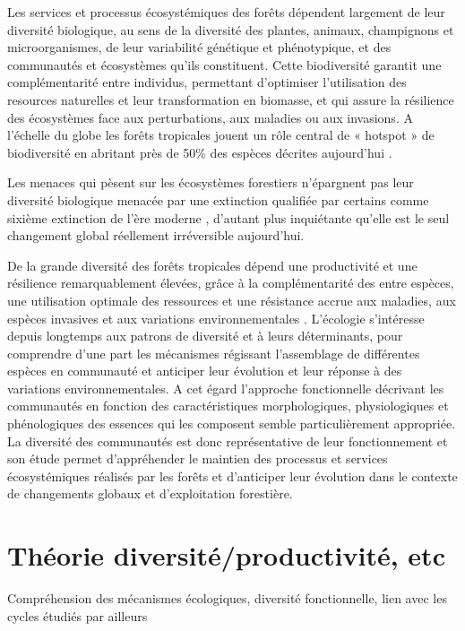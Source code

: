 \documentclass[
  11pt,
  french,
  A4paper,
  extrafontsizes,onecolumn,openright
  ]{memoir}
\begin{document}
Les services et processus écosystémiques des forêts dépendent largement
de leur diversité biologique, au sens de la diversité des plantes,
animaux, champignons et microorganismes, de leur variabilité génétique
et phénotypique, et des communautés et écosystèmes qu'ils constituent.
Cette biodiversité garantit une complémentarité entre individus,
permettant d'optimiser l'utilisation des resources naturelles et leur
transformation en biomasse, et qui assure la résilience des écosystèmes
face aux perturbations, aux maladies ou aux invasions. A l'échelle du
globe les forêts tropicales jouent un rôle central de « hotspot » de
biodiversité en abritant près de 50\% des espèces décrites aujourd'hui
\autocite{Wright2005}.

Les menaces qui pèsent sur les écosystèmes forestiers n'épargnent pas
leur diversité biologique menacée par une extinction qualifiée par
certains comme sixième extinction de l'ère moderne
\autocite{Vitousek1997}, d'autant plus inquiétante qu'elle est le seul
changement global réellement irréversible aujourd'hui.

De la grande diversité des forêts tropicales dépend une productivité et
une résilience remarquablement élevées, grâce à la complémentarité des
entre espèces, une utilisation optimale des ressources et une résistance
accrue aux maladies, aux espèces invasives et aux variations
environnementales \autocite{Tilman2014}. L'écologie s'intéresse depuis
longtemps aux patrons de diversité et à leurs déterminants, pour
comprendre d'une part les mécanismes régissant l'assemblage de
différentes espèces en communauté et anticiper leur évolution et leur
réponse à des variations environnementales. A cet égard l'approche
fonctionnelle décrivant les communautés en fonction des caractéristiques
morphologiques, physiologiques et phénologiques des essences qui les
composent \autocite{Violle2007b} semble particulièrement appropriée. La
diversité des communautés est donc représentative de leur fonctionnement
et son étude permet d'appréhender le maintien des processus et services
écosystémiques réalisés par les forêts et d'anticiper leur évolution
dans le contexte de changements globaux et d'exploitation forestière.

\section{Théorie diversité/productivité,
etc}\label{theorie-diversiteproductivite-etc}

Compréhension des mécanismes écologiques, diversité fonctionnelle, lien
avec les cycles étudiés par ailleurs
\end{document}
